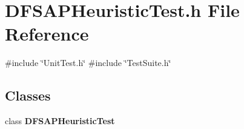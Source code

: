 \section{D\+F\+S\+A\+P\+Heuristic\+Test.\+h File Reference}
\label{DFSAPHeuristicTest_8h}
{\ttfamily \#include \char`\"{}Unit\+Test.\+h\char`\"{}}\newline
{\ttfamily \#include \char`\"{}Test\+Suite.\+h\char`\"{}}\newline
\subsection*{Classes}
\begin{DoxyCompactItemize}
\item 
class \textbf{ D\+F\+S\+A\+P\+Heuristic\+Test}
\end{DoxyCompactItemize}
